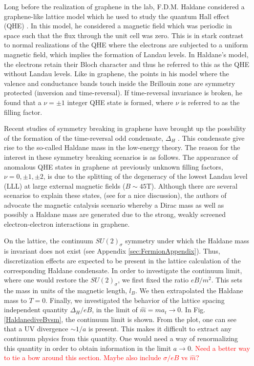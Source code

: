 \documentclass[aps,prd,twocolumn,showpacs,superscriptaddress,groupedaddress]{revtex4}  %
\begin{document}
Long before the realization of graphene in the lab, F.D.M. Haldane considered a graphene-like lattice model which he used to study the quantum Hall effect (QHE) \cite{Haldane}.
In this model, he considered a magnetic field which was periodic in space such that the flux through the unit cell was zero. This is in stark contrast to normal realizations of the QHE 
where the electrons are subjected to a uniform magnetic field, which implies the formation of Landau levels. In Haldane's model, the electrons retain their Bloch character and thus he referred to 
this as the QHE without Landau levels. Like in graphene, the points in his model where the valence and conductance bands touch inside the Brillouin zone are symmetry protected (inversion and time-reversal).
If time-reversal invariance is broken, he found that a $\nu = \pm 1$ integer QHE state is formed, where $\nu$ is referred to as the filling factor. 

Recent studies of symmetry breaking in graphene have brought up the possbility of the formation of the time-reversal odd condensate, $\Delta_H$ \cite{MiranskyGraphene2,MiranskyGraphene3}. This condensate give rise to the so-called Haldane mass in the low-energy theory.
The reason for the interest in these symmetry breaking scenarios is as follows.
The appearance of anomalous QHE states in graphene at previously unknown filling factors, $\nu = 0, \pm 1, \pm 2$, is due to the splitting of the degeneracy of the lowest Landau level (LLL) at large external magnetic fields ($B \sim 45 \text{T}$).
Although there are several scenarios to explain these states, (see \cite{Yang} for a nice discussion), the authors of \cite{MiranskyGraphene2, MiranskyGraphene3} advocate the magnetic catalysis scenario whereby a Dirac mass as well as possibly a Haldane mass are generated due to the strong, weakly screened
electron-electron interactions in graphene.

On the lattice, the continuum $SU(2)_{\sigma}$ symmetry under which the Haldane mass is invariant does not exist (see Appendix \ref{sec:FermionAppendix}). Thus, discretization effects are expected to be present in the lattice calculation of the corresponding Haldane condensate. In order to investigate the continuum limit, where one would restore the $SU(2)_{\sigma}$, we first fixed the ratio $eB/m^2$. This sets the mass in units of the magnetic length, $l_B$. We then extrapolated the Haldane mass to $T=0$. Finally, we investigated the behavior of the lattice spacing independent quantity $\Delta_H/eB$, in the limit of $\hat{m} = m a_t \to 0$. 
In Fig. \ref{HaldanediveBvsm}, the continuum limit is shown. From the plot, one can see that a UV divergence $\sim 1/a$ is present. This makes it difficult to extract any continuum physics from this quantity. One would need a way of renormalizing this quantity in order to obtain information in the limit $a \to 0$.
\textcolor{red}{Need a better way to tie a bow around this section. Maybe also include $\sigma/eB$ vs $\hat{m}$?}
\end{document}
